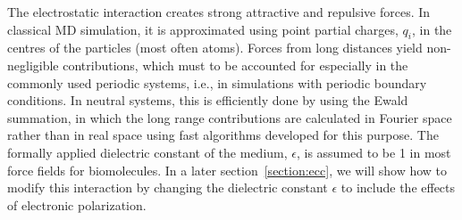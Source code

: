 
The electrostatic interaction creates strong attractive and repulsive forces. 
In classical MD simulation, it is approximated using point partial charges, $q_i$, in the centres of the particles (most often atoms). 
Forces from long distances yield non-negligible contributions,
which must to be accounted for especially in the commonly used 
periodic systems, i.e., in simulations with periodic boundary conditions. 
In neutral systems, this is efficiently done by using the Ewald summation,
in which the long range contributions are calculated in Fourier space rather than in real space
using fast algorithms developed for this purpose. \citep{darden93, essman95}
The formally applied dielectric constant of the medium, $\epsilon$,  
is assumed to be 1 in most force fields for biomolecules. 
In a later section~\ref{section:ecc}, we will show how to modify this interaction 
by changing the dielectric constant $\epsilon$ to include the effects of electronic polarization. 




